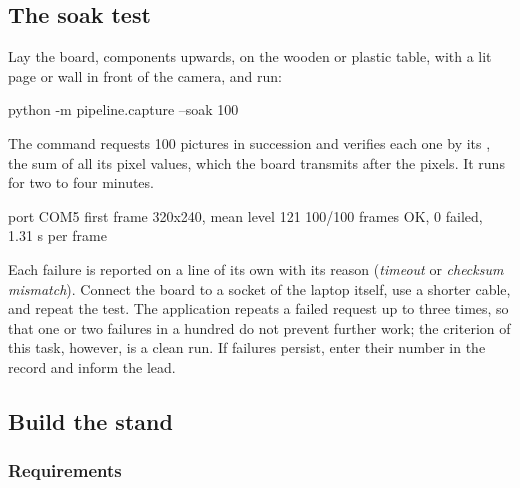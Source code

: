 \subsection{The soak test}

\label{st:soak}
Lay the board, components upwards, on the wooden or plastic table, with a lit page or wall in
front of the camera, and run:
\begin{ps}
python -m pipeline.capture --soak 100
\end{ps}
The command requests 100 pictures in succession and verifies each one by its ,
the sum of all its pixel values, which the board transmits after the pixels. It runs for two to
four minutes.
\begin{out}
port COM5
first frame 320x240, mean level 121
100/100 frames OK, 0 failed, 1.31 s per frame
\end{out}

\begin{iffail}
Each failure is reported on a line of its own with its reason (\emph{timeout} or \emph{checksum
mismatch}). Connect the board to a socket of the laptop itself, use a shorter cable, and repeat
the test. The application repeats a failed request up to three times, so that one or two
failures in a hundred do not prevent further work; the criterion of this task, however, is a
clean run. If failures persist, enter their number in the record and inform the lead.
\end{iffail}

\subsection{Build the stand}
\label{sec:stand}

\subsubsection*{Requirements}

